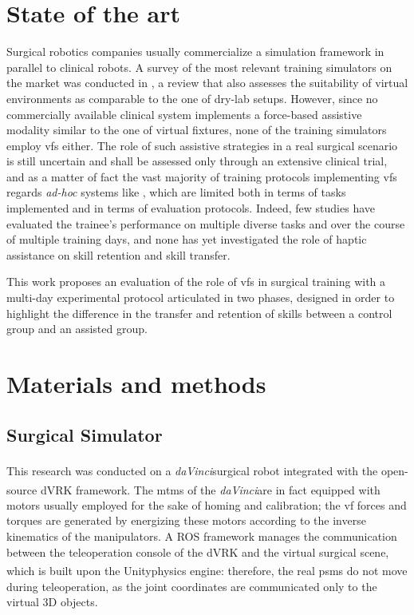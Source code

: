 \documentclass{article}
\newcommand{\cright}{\textsuperscript{\textregistered}\phantom{..}}
\begin{document}
\begin{multicols}{2}
\section{State of the art}
Surgical robotics companies usually commercialize a simulation framework in parallel to clinical robots. A survey of the most relevant training simulators on the market was conducted in \cite{Bric2016}, a review that also assesses the suitability of virtual environments as comparable to the one of dry-lab setups. However, since no commercially available clinical system implements a force-based assistive modality similar to the one of virtual fixtures, none of the training simulators employ \acp{vf} either. The role of such assistive strategies in a real surgical scenario is still uncertain and shall be assessed only through an extensive clinical trial, and as a matter of fact the vast majority of training protocols implementing \acp{vf} regards \textit{ad-hoc} systems like \cite{Lin2014}, which are limited both in terms of tasks implemented and in terms of evaluation protocols. Indeed, few studies \cite{Enayati2018} have evaluated the trainee's performance on multiple diverse tasks and over the course of multiple training days, and none has yet investigated the role of haptic assistance on skill retention and skill transfer. 

This work proposes an evaluation of the role of \acp{vf} in surgical training with a multi-day experimental protocol articulated in two phases, designed in order to highlight the difference in the transfer and retention of skills between a control group and an assisted group. 
\section{Materials and methods}
\subsection{Surgical Simulator}
This research was conducted on a \textit{daVinci}\cright surgical robot integrated with the open-source dVRK \cite{Kazanzidesf2014} framework. The \acp{mtm} of the \textit{daVinci}\cright are in fact equipped with motors usually employed for the sake of homing and calibration; the \ac{vf} forces and torques are generated by energizing these motors according to the inverse kinematics of the manipulators. A ROS \cite{ros} framework manages the communication between the teleoperation console of the dVRK and the virtual surgical scene, which is built upon the Unity\cright physics engine: therefore, the real \acp{psm} do not move during teleoperation, as the joint coordinates are communicated only to the virtual 3D objects.



\end{multicols}
\end{document}
